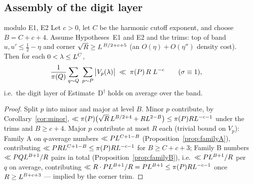 \subsection{Assembly of the digit layer}

\begin{proposition}
\label{prop:digit-assembly}
\statusP{} modulo E1, E2\quad
Let $c>0$, let $C$ be the harmonic cutoff exponent, and choose
$B=C+c+4$. Assume Hypotheses~E1 and E2 and the trims: top of band
$u,u'\le\tfrac12-\eta$ and corner
$\sqrt R\ge L^{\,B/2+c+5}$ (an $O(\eta)+O(\eta'')$ density cost).
Then for each $0<\lambda\le L^{C}$,
\[
\frac{1}{\pi(Q)}\sum_{q\sim Q}\;\sum_{p\sim P}\big|V_p(\lambda)\big|
\;\ll\;\pi(P)\,R\;L^{-c}
\qquad(\sigma\equiv1),
\]
i.e.\ the digit layer of Estimate~D$^\dagger$ holds on average over the
band.
\end{proposition}

\begin{proof}
Split $p$ into minor and major at level $B$. Minor $p$ contribute, by
Corollary~\ref{cor:minor},
$\ll\pi(P)\big(\sqrt R\,L^{B/2+4}+RL^{2-B}\big)
\le\pi(P)RL^{-c-1}$
under the trims and $B\ge c+4$. Major $p$ contribute at most $R$ each
(trivial bound on $V_p$): Family A on $q$-average numbers
$\ll PL^{C+1-B}$ (Proposition~\ref{prop:familyA}), contributing
$\ll PRL^{C+1-B}\le\pi(P)RL^{-c-1}$ for $B\ge C+c+3$; Family B
numbers $\ll PQL^{B+1}/R$ pairs in total
(Proposition~\ref{prop:familyB}), i.e.\ $\ll PL^{B+1}/R$ per $q$ on
average, contributing $\ll R\cdot PL^{B+1}/R=PL^{B+1}
\le\pi(P)RL^{-c-1}$ once $R\ge L^{B+c+3}$ --- implied by the
corner trim.
\end{proof}
